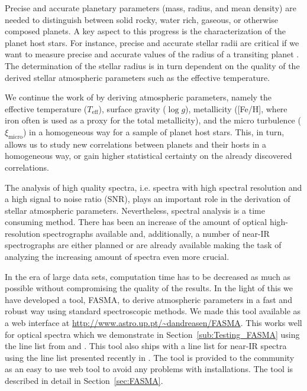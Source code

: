 \documentclass{aa}
\begin{document}
Precise and accurate planetary parameters (mass, radius, and mean density) are
needed to distinguish between solid rocky, water rich, gaseous, or otherwise
composed planets. A key aspect to this progress is the characterization of the
planet host stars. For instance, precise and accurate stellar radii are critical
if we want to measure precise and accurate values of the radius of a transiting
planet \citep[see e.g.][]{Torres2012,Mortier2013}. The determination of the
stellar radius is in turn dependent on the quality of the derived stellar
atmospheric parameters such as the effective temperature.

We continue the work of \citet{Santos13} by deriving atmospheric parameters,
namely the effective temperature ($T_\mathrm{eff}$), surface gravity ($\log g$),
metallicity ([Fe/H], where iron often is used as a proxy for the total
metallicity), and the micro turbulence ($\xi_\mathrm{micro}$) in a homogeneous
way for a sample of planet host stars. This, in turn, allows us to study new
correlations between planets and their hosts in a homogeneous way,  or gain
higher statistical certainty on the already discovered correlations.

The analysis of high quality spectra, i.e. spectra with high spectral resolution
and a high signal to noise ratio (SNR), plays an important role in the
derivation of stellar atmospheric parameters. Nevertheless, spectral analysis is
a time consuming method. There has been an increase of the amount of  optical
high-resolution spectrographs available and, additionally, a number of near-IR
spectrographs are either planned or are already available making the task of
analyzing the increasing amount of spectra even more crucial.

In the era of large data sets, computation time has to be decreased as much as
possible without compromising the quality of the results. In the light of this
we have developed a tool, FASMA, to derive atmospheric parameters in a fast and
robust way using standard spectroscopic methods. We made this tool available as
a web interface at \url{http://www.astro.up.pt/~dandreasen/FASMA}. This works
well for optical spectra which we demonstrate in Section~\ref{sub:Testing_FASMA}
using the line list from \citet{Sousa2008a} and \citet{Tsantaki2013}. This tool
also ships with a line list for near-IR spectra using the line list presented
recently in \citet{Andreasen2016}. The tool is provided to the community as an
easy to use web tool to avoid any problems with installations. The tool is
described in detail in Section~\ref{sec:FASMA}.
\end{document}

